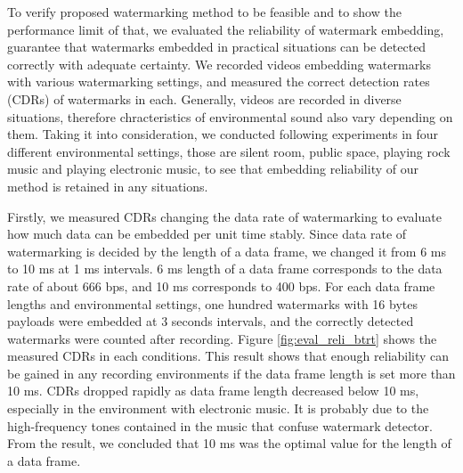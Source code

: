 To verify proposed watermarking method to be feasible and to show the performance limit of that, we evaluated the reliability of watermark embedding, guarantee that watermarks embedded in practical situations can be detected correctly with adequate certainty.
We recorded videos embedding watermarks with various watermarking settings, and measured the correct detection rates (CDRs) of watermarks in each.
Generally, videos are recorded in diverse situations, therefore chracteristics of environmental sound also vary depending on them.
Taking it into consideration, we conducted following experiments in four different environmental settings, those are silent room, public space, playing rock music and playing electronic music, to see that embedding reliability of our method is retained in any situations.

Firstly, we measured CDRs changing the data rate of watermarking to evaluate how much data can be embedded per unit time stably.
Since data rate of watermarking is decided by the length of a data frame, we changed it from 6 ms to 10 ms at 1 ms intervals.
6 ms length of a data frame corresponds to the data rate of about 666 bps, and 10 ms corresponds to 400 bps.
For each data frame lengths and environmental settings, one hundred watermarks with 16 bytes payloads were embedded at 3 seconds intervals, and the correctly detected watermarks were counted after recording.
Figure \ref{fig:eval_reli_btrt} shows the measured CDRs in each conditions.
This result shows that enough reliability can be gained in any recording environments if the data frame length is set more than 10 ms.
CDRs dropped rapidly as data frame length decreased below 10 ms, especially in the environment with electronic music.
It is probably due to the high-frequency tones contained in the music that confuse watermark detector.
From the result, we concluded that 10 ms was the optimal value for the length of a data frame.

